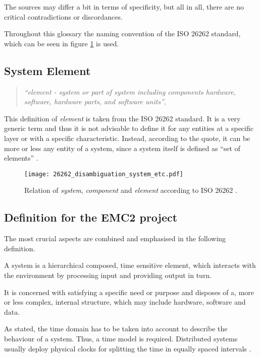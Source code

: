The sources may differ a bit in terms of specificity, but all in all, there are no critical contradictions or discordances. 

Throughout this glossary the naming convention of the ISO 26262 standard, which can be seen in figure \ref{fig:26262_disambiguation} is used.


\subsection{System Element}
\label{sec:system_element}
\begin{quote}
\emph{``element - system or part of system including components hardware, software, hardware parts, and software units''}, \cite{iso26262:1}
\end{quote}
This definition of \emph{element} is taken from the ISO 26262 standard. It is a very generic term and thus it is not advisable to define it for any entities at a specific layer or with a specific characteristic. Instead, according to the quote, it can be more or less any entity of a system, since a system itself is defined as ``set of elements'' \cite{iso26262:1}.

\begin{figure}[ht]
\centering
\texttt{[image: 26262\_disambiguation\_system\_etc.pdf]}

\caption{Relation of \emph{system}, \emph{component} and \emph{element} according to ISO 26262 \cite{iso26262:course1}.}
\label{fig:26262_disambiguation}
\end{figure}

\subsection{Definition for the EMC2 project}
The most crucial aspects are combined and emphasised in the following definition.

\begin{myquote}
A system is a hierarchical composed, time sensitive element, which interacts with the environment by processing input and providing output in turn.

It is concerned with satisfying a specific need or purpose and disposes of a, more or less complex, internal structure, which may include hardware, software and data.
\end{myquote}

As stated, the time domain has to be taken into account to describe the behaviour of a system. Thus, a time model is required. Distributed systems usually deploy physical clocks for splitting the time in equally spaced intervals \cite[p.7-8]{genesys}.

